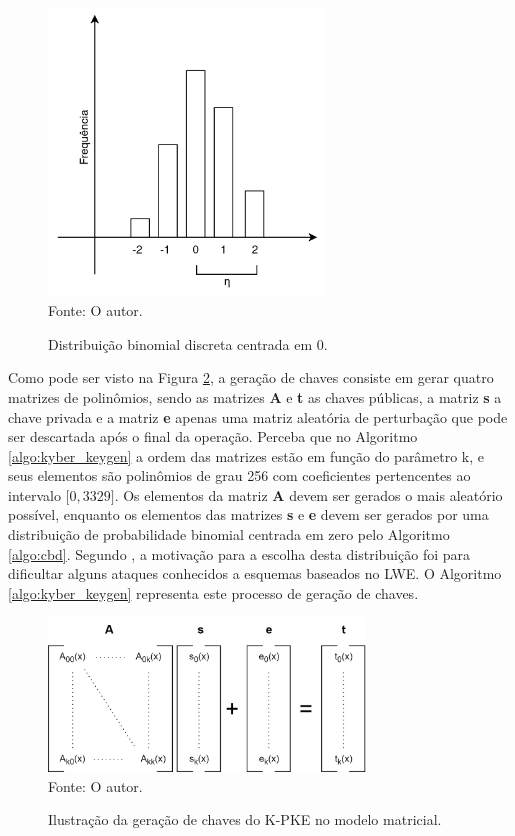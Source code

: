     \begin{figure}[htb!]
        \centering
        \caption{Distribuição binomial discreta centrada em 0.}
        \includegraphics[width=0.65\textwidth]{Figuras/cbd.png}\\
        \footnotesize{Fonte: O autor.}
        \label{fig:cbd}
    \end{figure}

    Como pode ser visto na Figura \ref{fig:kyber_key_gen}, a geração de chaves consiste em gerar quatro matrizes de polinômios, sendo as matrizes \textbf{A} e \textbf{t} as chaves públicas, a matriz \textbf{s} a chave privada e a matriz \textbf{e} apenas uma matriz aleatória de perturbação que pode ser descartada após o final da operação. Perceba que no Algoritmo \ref{algo:kyber_keygen} a ordem das matrizes estão em função do parâmetro k, e seus elementos são polinômios de grau 256 com coeficientes pertencentes ao intervalo ${[}0,3329{]}$. Os elementos da matriz \textbf{A} devem ser gerados o mais aleatório possível, enquanto os elementos das matrizes \textbf{s} e \textbf{e} devem ser gerados por uma distribuição de probabilidade binomial centrada em zero pelo Algoritmo \ref{algo:cbd}. Segundo \cite{kyber}, a motivação para a escolha desta distribuição foi para dificultar alguns ataques conhecidos a esquemas baseados no \ac{LWE}. O Algoritmo \ref{algo:kyber_keygen} representa este processo de geração de chaves.

    \begin{figure}[htb!]
        \centering
        \caption{Ilustração da geração de chaves do K-PKE no modelo matricial.}
        \includegraphics[width=0.75\textwidth]{Figuras/kyber_keygen.png}\\
        \footnotesize{Fonte: O autor.}
        \label{fig:kyber_key_gen}
    \end{figure}

